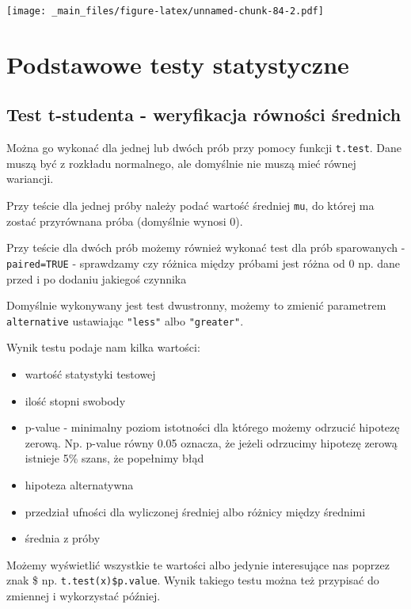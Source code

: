 \documentclass[
]{book}
\begin{document}
\texttt{[image: \_main\_files/figure-latex/unnamed-chunk-84-2.pdf]}

\hypertarget{podstawowe-testy-statystyczne}{%
\section{Podstawowe testy statystyczne}\label{podstawowe-testy-statystyczne}}

\hypertarget{test-t-studenta---weryfikacja-ruxf3wnoux15bci-ux15brednich}{%
\subsection{Test t-studenta - weryfikacja równości średnich}\label{test-t-studenta---weryfikacja-ruxf3wnoux15bci-ux15brednich}}

Można go wykonać dla jednej lub dwóch prób przy pomocy funkcji \texttt{t.test}. Dane muszą być z rozkładu normalnego, ale domyślnie nie muszą mieć równej wariancji.

Przy teście dla jednej próby należy podać wartość średniej \texttt{mu}, do której ma zostać przyrównana próba (domyślnie wynosi 0).

Przy teście dla dwóch prób możemy również wykonać test dla prób sparowanych - \texttt{paired=TRUE} - sprawdzamy czy różnica między próbami jest różna od 0 np. dane przed i po dodaniu jakiegoś czynnika

Domyślnie wykonywany jest test dwustronny, możemy to zmienić parametrem \texttt{alternative} ustawiając \texttt{"less"} albo \texttt{"greater"}.

Wynik testu podaje nam kilka wartości:

\begin{itemize}
\item
  wartość statystyki testowej
\item
  ilość stopni swobody
\item
  p-value - minimalny poziom istotności dla którego możemy odrzucić hipotezę zerową. Np. p-value równy 0.05 oznacza, że jeżeli odrzucimy hipotezę zerową istnieje 5\% szans, że popełnimy błąd
\item
  hipoteza alternatywna
\item
  przedział ufności dla wyliczonej średniej albo różnicy między średnimi
\item
  średnia z próby
\end{itemize}

Możemy wyświetlić wszystkie te wartości albo jedynie interesujące nas poprzez znak \$ np. \texttt{t.test(x)\$p.value}. Wynik takiego testu można też przypisać do zmiennej i wykorzystać później.
\end{document}
